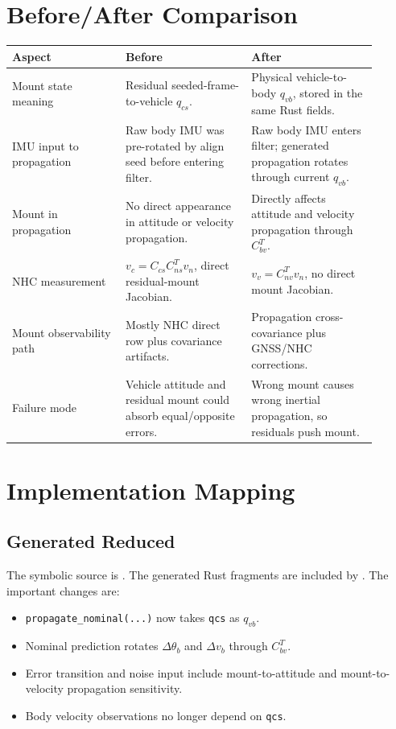 \documentclass[11pt]{article}
\newcommand{\T}{^{T}}
\begin{document}
\section{Before/After Comparison}

\begin{longtable}{>{\raggedright\arraybackslash}p{0.28\linewidth} >{\raggedright\arraybackslash}p{0.31\linewidth} >{\raggedright\arraybackslash}p{0.31\linewidth}}
\toprule
\textbf{Aspect} & \textbf{Before} & \textbf{After} \\
\midrule
Mount state meaning &
Residual seeded-frame-to-vehicle \(q_{cs}\). &
Physical vehicle-to-body \(q_{vb}\), stored in the same Rust fields. \\
\addlinespace
IMU input to propagation &
Raw body IMU was pre-rotated by align seed before entering filter. &
Raw body IMU enters filter; generated propagation rotates through current \(q_{vb}\). \\
\addlinespace
Mount in propagation &
No direct appearance in attitude or velocity propagation. &
Directly affects attitude and velocity propagation through \(C_{bv}\T\). \\
\addlinespace
NHC measurement &
\(v_c=C_{cs}C_{ns}\T v_n\), direct residual-mount Jacobian. &
\(v_v=C_{nv}\T v_n\), no direct mount Jacobian. \\
\addlinespace
Mount observability path &
Mostly NHC direct row plus covariance artifacts. &
Propagation cross-covariance plus GNSS/NHC corrections. \\
\addlinespace
Failure mode &
Vehicle attitude and residual mount could absorb equal/opposite errors. &
Wrong mount causes wrong inertial propagation, so residuals push mount. \\
\bottomrule
\end{longtable}

\section{Implementation Mapping}

\subsection{Generated Reduced}

The symbolic source is . The generated Rust fragments are
included by . The important changes are:
\begin{itemize}[leftmargin=*]
  \item \texttt{propagate\_nominal(...)} now takes \texttt{qcs} as \(q_{vb}\).
  \item Nominal prediction rotates \(\Delta\theta_b\) and \(\Delta v_b\)
        through \(C_{bv}\T\).
  \item Error transition and noise input include mount-to-attitude and
        mount-to-velocity propagation sensitivity.
  \item Body velocity observations no longer depend on \texttt{qcs}.
\end{itemize}
\end{document}
